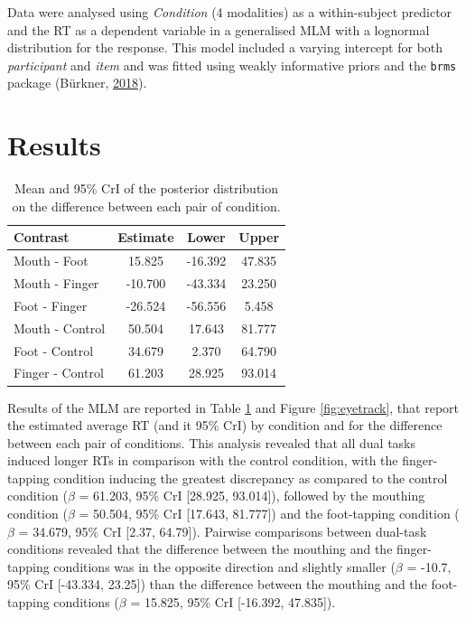 \documentclass[a4paper,12pt,twoside,openright,oldfontcommands]{memoir}
\begin{document}
Data were analysed using \emph{Condition} (4 modalities) as a within-subject predictor and the RT as a dependent variable in a generalised MLM with a lognormal distribution for the response. This model included a varying intercept for both \emph{participant} and \emph{item} and was fitted using weakly informative priors and the \texttt{brms} package (Bürkner, \protect\hyperlink{ref-R-brms}{2018}).

\hypertarget{results-5}{%
\section{Results}\label{results-5}}

\begin{table}[H]
\begin{center}
\begin{threeparttable}
\caption{\label{tab:RTestimates}Mean and 95\% CrI of the posterior distribution on the difference between each pair of condition.}
\small{
\begin{tabular}{lccc}
\toprule
Contrast & \multicolumn{1}{c}{Estimate} & \multicolumn{1}{c}{Lower} & \multicolumn{1}{c}{Upper}\\
\midrule
Mouth - Foot & 15.825 & -16.392 & 47.835\\
Mouth - Finger & -10.700 & -43.334 & 23.250\\
Foot - Finger & -26.524 & -56.556 & 5.458\\
Mouth - Control & 50.504 & 17.643 & 81.777\\
Foot - Control & 34.679 & 2.370 & 64.790\\
Finger - Control & 61.203 & 28.925 & 93.014\\
\bottomrule
\end{tabular}
}
\end{threeparttable}
\end{center}
\end{table}

Results of the MLM are reported in Table \ref{tab:RTestimates} and Figure \ref{fig:eyetrack}, that report the estimated average RT (and it 95\% CrI) by condition and for the difference between each pair of conditions. This analysis revealed that all dual tasks induced longer RTs in comparison with the control condition, with the finger-tapping condition inducing the greatest discrepancy as compared to the control condition (\(\beta\) = 61.203, 95\% CrI {[}28.925, 93.014{]}), followed by the mouthing condition (\(\beta\) = 50.504, 95\% CrI {[}17.643, 81.777{]}) and the foot-tapping condition (\(\beta\) = 34.679, 95\% CrI {[}2.37, 64.79{]}). Pairwise comparisons between dual-task conditions revealed that the difference between the mouthing and the finger-tapping conditions was in the opposite direction and slightly smaller (\(\beta\) = -10.7, 95\% CrI {[}-43.334, 23.25{]}) than the difference between the mouthing and the foot-tapping conditions (\(\beta\) = 15.825, 95\% CrI {[}-16.392, 47.835{]}).
\end{document}

